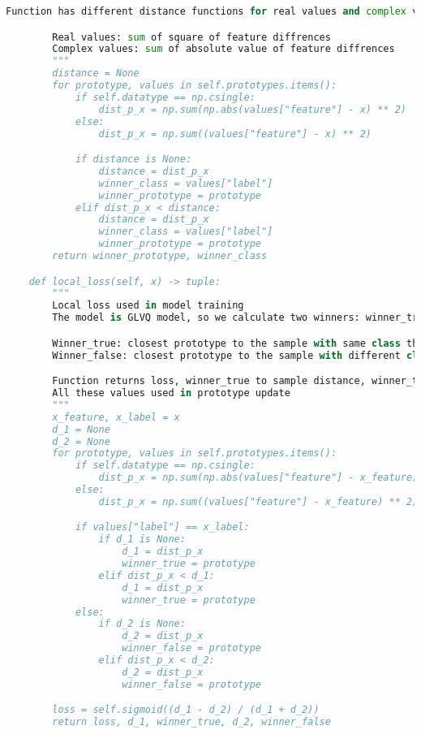 \begin{lstlisting}[language = python]
        Function has different distance functions for real values and complex values

        Real values: sum of square of feature diffrences
        Complex values: sum of absolute value of feature diffrences
        """
        distance = None
        for prototype, values in self.prototypes.items():
            if self.datatype == np.csingle:
                dist_p_x = np.sum(np.abs(values["feature"] - x) ** 2)
            else:
                dist_p_x = np.sum((values["feature"] - x) ** 2)

            if distance is None:
                distance = dist_p_x
                winner_class = values["label"]
                winner_prototype = prototype
            elif dist_p_x < distance:
                distance = dist_p_x
                winner_class = values["label"]
                winner_prototype = prototype
        return winner_prototype, winner_class

    def local_loss(self, x) -> tuple:
        """
        Local loss used in model training
        The model is GLVQ model, so we calculate two winners: winner_true, winner_false

        Winner_true: closest prototype to the sample with same class than the sample
        Winner_false: closest prototype to the sample with different class than the sample

        Function returns loss, winner_true to sample distance, winner_true, winner_false to sample distance, winner_false as tuple
        All these values used in prototype update
        """
        x_feature, x_label = x
        d_1 = None
        d_2 = None
        for prototype, values in self.prototypes.items():
            if self.datatype == np.csingle:
                dist_p_x = np.sum(np.abs(values["feature"] - x_feature) ** 2)
            else:
                dist_p_x = np.sum((values["feature"] - x_feature) ** 2)

            if values["label"] == x_label:
                if d_1 is None:
                    d_1 = dist_p_x
                    winner_true = prototype
                elif dist_p_x < d_1:
                    d_1 = dist_p_x
                    winner_true = prototype
            else:
                if d_2 is None:
                    d_2 = dist_p_x
                    winner_false = prototype
                elif dist_p_x < d_2:
                    d_2 = dist_p_x
                    winner_false = prototype

        loss = self.sigmoid((d_1 - d_2) / (d_1 + d_2))
        return loss, d_1, winner_true, d_2, winner_false


\end{lstlisting}
